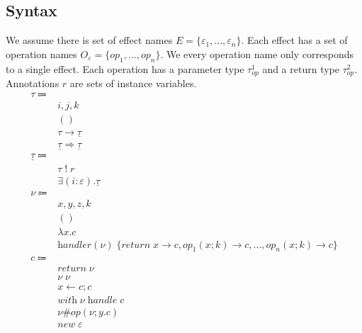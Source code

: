\documentclass[12pt]{article}
\newcommand\Eff[0]{E}
\newcommand\eff[0]{\varepsilon}
\newcommand\Op[0]{O}
\newcommand\op[0]{op}
\newcommand\pty[1]{\ty^1_{#1}}
\newcommand\rty[1]{\ty^2_{#1}}
\newcommand\ty[0]{\tau}
\newcommand\tunit[0]{()}
\newcommand\tarr[2]{#1 \rightarrow #2}
\newcommand\thandler[2]{#1 \Rightarrow #2}
\newcommand\cty[0]{\underline{\ty}}
\newcommand\aty[2]{#1 \; ! \; #2}
\newcommand\texists[3]{\exists(#1:#2) . #3}
\newcommand\val[0]{\nu}
\newcommand\vunit[0]{()}
\newcommand\vabs[2]{\lambda #1 . #2}
\newcommand\vhandleri[2]{\textit{handler} ( #1 ) \; \{#2\}}
\newcommand\vhandlerci[1]{\vhandleri{#1}{
	\textit{return} \; x \rightarrow \comp,
	\op_1(x ; k) \rightarrow \comp,
	...,
	\op_n(x ; k) \rightarrow \comp
}}
\newcommand\comp[0]{c}
\newcommand\creturn[1]{\textit{return} \; #1}
\newcommand\capp[2]{#1 \; #2}
\newcommand\cdo[3]{#1 \leftarrow #2 ; #3}
\newcommand\copi[5]{#1 \# #2(#3 ; #4 . #5)}
\newcommand\chandle[2]{\textit{with} \; #1 \; \textit{handle} \; #2}
\newcommand\cnew[1]{\textit{new} \; #1}
\begin{document}
\subsection{Syntax}
We assume there is set of effect names $\Eff = \{ \eff_1, ..., \eff_n \}$.
Each effect has a set of operation names $\Op_\eff = \{ \op_1, ..., \op_n \}$.
We every operation name only corresponds to a single effect.
Each operation has a parameter type $\pty{\op}$ and a return type $\rty{\op}$.
Annotations $r$ are sets of instance variables.
\\
\begin{align*}
	\ty \Coloneqq 				& 											\tag{value types} \\
									& i, j, k									\tag{instance variables} \\
									& \tunit									\tag{unit type} \\
									& \tarr{\ty}{\cty}						\tag{type of functions} \\
									& \thandler{\cty}{\cty}				\tag{type of handlers} \\
	\cty \Coloneqq 			& 											\tag{computation types} \\
									& \aty{\ty}{r}							\tag{annotated type} \\
									& \texists{i}{\eff}{\cty}				\tag{existential} \\
	\val \Coloneqq			&											\tag{values} \\
									& x, y, z, k								\tag{variables} \\
									& \vunit									\tag{unit value} \\
									& \vabs{x}{\comp}					\tag{abstraction} \\
									& \vhandlerci{\val}						\tag{handler} \\
	\comp \Coloneqq		&											\tag{computations} \\
									& \creturn{\val}						\tag{return value as computation} \\
									& \capp{\val}{\val}					\tag{application} \\
									& \cdo{x}{\comp}{\comp}			\tag{sequencing} \\
									& \chandle{\val}{\comp}			\tag{handler application} \\
									& \copi{\val}{\op}{\val}{y}{\comp}	\tag{operation call} \\
									& \cnew{\eff}							\tag{instance creation} \\
\end{align*}
\end{document}
